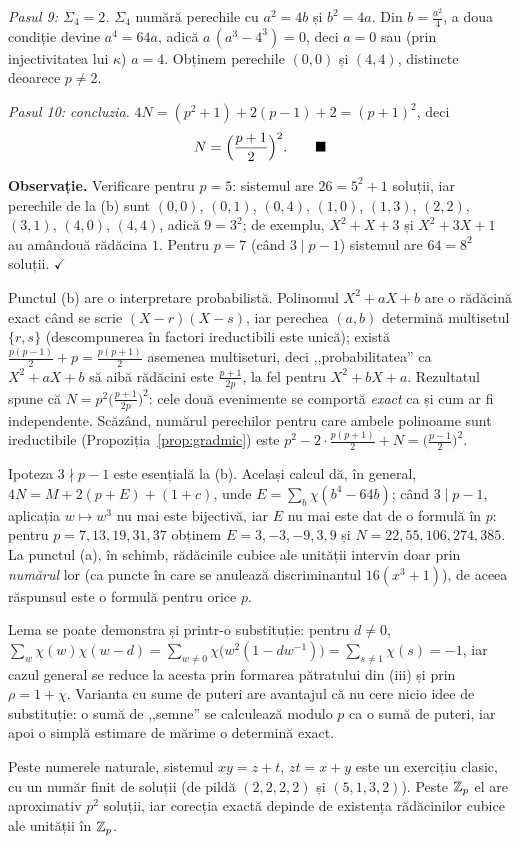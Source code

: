\begin{solutie}
\emph{Pasul 9: $\Sigma_4 = 2$.} $\Sigma_4$ numără perechile cu $a^2 = 4b$ și $b^2 = 4a$. Din $b = \frac{a^2}{4}$, a doua condiție devine $a^4 = 64a$, adică $a\,(a^3 - 4^3) = 0$, deci $a = 0$ sau (prin injectivitatea lui $\kappa$) $a = 4$. Obținem perechile $(0,0)$ și $(4,4)$, distincte deoarece $p \neq 2$.

\emph{Pasul 10: concluzia.} $4N = (p^2 + 1) + 2(p - 1) + 2 = (p+1)^2$, deci
\[
  N = \Bigl(\frac{p+1}{2}\Bigr)^2 . \qquad \blacksquare
\]

\medskip
\noindent\textbf{Observație.} Verificare pentru $p = 5$: sistemul are $26 = 5^2 + 1$ soluții, iar perechile de la (b) sunt $(0,0)$, $(0,1)$, $(0,4)$, $(1,0)$, $(1,3)$, $(2,2)$, $(3,1)$, $(4,0)$, $(4,4)$, adică $9 = 3^2$; de exemplu, $X^2 + X + 3$ și $X^2 + 3X + 1$ au amândouă rădăcina $1$. Pentru $p = 7$ (când $3 \mid p-1$) sistemul are $64 = 8^2$ soluții. $\checkmark$

Punctul (b) are o interpretare probabilistă. Polinomul $X^2 + aX + b$ are o rădăcină exact când se scrie $(X - r)(X - s)$, iar perechea $(a,b)$ determină multisetul $\{r, s\}$ (descompunerea în factori ireductibili este unică); există $\frac{p(p-1)}{2} + p = \frac{p(p+1)}{2}$ asemenea multiseturi, deci ,,probabilitatea'' ca $X^2 + aX + b$ să aibă rădăcini este $\frac{p+1}{2p}$, la fel pentru $X^2 + bX + a$. Rezultatul spune că $N = p^2 \bigl(\frac{p+1}{2p}\bigr)^2$: cele două evenimente se comportă \emph{exact} ca și cum ar fi independente. Scăzând, numărul perechilor pentru care ambele polinoame sunt ireductibile (Propoziția~\ref{prop:gradmic}) este $p^2 - 2 \cdot \frac{p(p+1)}{2} + N = \bigl(\frac{p-1}{2}\bigr)^2$.

Ipoteza $3 \nmid p-1$ este esențială la (b). Același calcul dă, în general, $4N = M + 2(p + E) + (1 + c)$, unde $E = \sum_b \chi(b^4 - 64b)$; când $3 \mid p - 1$, aplicația $w \mapsto w^3$ nu mai este bijectivă, iar $E$ nu mai este dat de o formulă în $p$: pentru $p = 7, 13, 19, 31, 37$ obținem $E = 3, -3, -9, 3, 9$ și $N = 22, 55, 106, 274, 385$. La punctul (a), în schimb, rădăcinile cubice ale unității intervin doar prin \emph{numărul} lor (ca puncte în care se anulează discriminantul $16(x^3+1)$), de aceea răspunsul este o formulă pentru orice $p$.

Lema se poate demonstra și printr-o substituție: pentru $d \neq 0$, $\sum_{w} \chi(w)\chi(w - d) = \sum_{w \neq 0} \chi\bigl(w^2(1 - d w^{-1})\bigr) = \sum_{s \neq 1} \chi(s) = -1$, iar cazul general se reduce la acesta prin formarea pătratului din (iii) și prin $\rho = 1 + \chi$. Varianta cu sume de puteri are avantajul că nu cere nicio idee de substituție: o sumă de ,,semne'' se calculează modulo $p$ ca o sumă de puteri, iar apoi o simplă estimare de mărime o determină exact.

Peste numerele naturale, sistemul $xy = z + t$, $zt = x + y$ este un exercițiu clasic, cu un număr finit de soluții (de pildă $(2,2,2,2)$ și $(5,1,3,2)$). Peste $\mathbb{Z}_p$ el are aproximativ $p^2$ soluții, iar corecția exactă depinde de existența rădăcinilor cubice ale unității în $\mathbb{Z}_p$.
\end{solutie}

